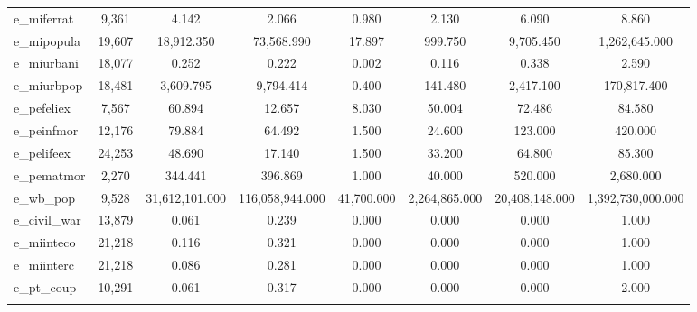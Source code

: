 \begin{table}[!htbp]
\begin{tabular}{@{\extracolsep{5pt}}lccccccc}
e\_miferrat & 9,361 & 4.142 & 2.066 & 0.980 & 2.130 & 6.090 & 8.860 \\ 
e\_mipopula & 19,607 & 18,912.350 & 73,568.990 & 17.897 & 999.750 & 9,705.450 & 1,262,645.000 \\ 
e\_miurbani & 18,077 & 0.252 & 0.222 & 0.002 & 0.116 & 0.338 & 2.590 \\ 
e\_miurbpop & 18,481 & 3,609.795 & 9,794.414 & 0.400 & 141.480 & 2,417.100 & 170,817.400 \\ 
e\_pefeliex & 7,567 & 60.894 & 12.657 & 8.030 & 50.004 & 72.486 & 84.580 \\ 
e\_peinfmor & 12,176 & 79.884 & 64.492 & 1.500 & 24.600 & 123.000 & 420.000 \\ 
e\_pelifeex & 24,253 & 48.690 & 17.140 & 1.500 & 33.200 & 64.800 & 85.300 \\ 
e\_pematmor & 2,270 & 344.441 & 396.869 & 1.000 & 40.000 & 520.000 & 2,680.000 \\ 
e\_wb\_pop & 9,528 & 31,612,101.000 & 116,058,944.000 & 41,700.000 & 2,264,865.000 & 20,408,148.000 & 1,392,730,000.000 \\ 
e\_civil\_war & 13,879 & 0.061 & 0.239 & 0.000 & 0.000 & 0.000 & 1.000 \\ 
e\_miinteco & 21,218 & 0.116 & 0.321 & 0.000 & 0.000 & 0.000 & 1.000 \\ 
e\_miinterc & 21,218 & 0.086 & 0.281 & 0.000 & 0.000 & 0.000 & 1.000 \\ 
e\_pt\_coup & 10,291 & 0.061 & 0.317 & 0.000 & 0.000 & 0.000 & 2.000 \\ 
\hline \\[-1.8ex] 
\end{tabular} 
\end{table} 
